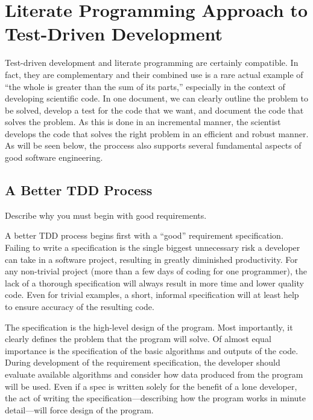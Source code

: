 \section{Literate Programming Approach to Test-Driven Development}
Test-driven development and literate programming are certainly compatible.  In fact, they are 
complementary and their combined use is a rare actual example of ``the whole is greater
than the sum of its parts,'' especially in the context of developing scientific code.  
In one document, we can clearly outline the problem to be solved, develop a test for the 
code that we want, and document the code that solves the problem. As this is done in an incremental
manner, the scientist develops the code that solves the right problem in an efficient and robust manner.
As will be seen below, the proccess also supports several fundamental aspects of good software
engineering.

\subsection{A Better TDD Process}\label{tdd-better}

\begin{TODO}
Describe why you must begin with good requirements.
\end{TODO}

A better TDD process begins first with a ``good'' requirement specification.
Failing to write a specification is the single biggest unnecessary risk a developer
can take in a software project, resulting in greatly diminished productivity. 
For any non-trivial project (more than a few days of coding for one programmer), 
the lack of a thorough specification will always result in more time and lower quality code.
Even for trivial examples, a short, informal specification will at least help to ensure
accuracy of the resulting code.

The specification is the high-level design of the program. 
Most importantly, it clearly defines the problem that the program will solve. 
Of almost equal importance is the specification of the
basic algorithms and outputs of the code. During development of the requirement specification,
the developer should evaluate available algorithms and consider how data produced from the 
program will be used.
Even if a spec is written solely for the benefit of a lone developer, the act of 
writing the specification---describing how the program works in 
minute detail---will force design of the program.

